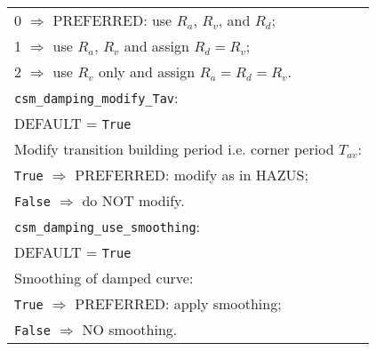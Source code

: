 \documentclass[a4paper, 12pt]{report}
\begin{document}
\begin{tabular}{|p{\textwidth}|}
 \hspace{0.5em} 0 $\Rightarrow$ \small{PREFERRED}: use $R_a$, $R_v$, and $R_d$; \\
 \hspace{0.5em} 1 $\Rightarrow$ use $R_a$, $R_v$ and assign $R_d= R_v$; \\
 \hspace{0.5em} 2 $\Rightarrow$ use $R_v$ only and assign $R_a=R_d=R_v$. \\
\hline \vspace{0.1em} \texttt{csm\_damping\_modify\_Tav}: \\
DEFAULT = \texttt{True} \\
Modify transition building period i.e. corner period $T_{av}$: \\
 \hspace{0.5em} \texttt{True} $\Rightarrow$ \small{PREFERRED}: modify as in HAZUS; \\
 \hspace{0.5em}  \texttt{False} $\Rightarrow$ do NOT modify. \\
\hline \vspace{0.1em} \texttt{csm\_damping\_use\_smoothing}: \\
DEFAULT = \texttt{True} \\
Smoothing of damped curve: \\
 \hspace{0.5em} \texttt{True} $\Rightarrow$ \small{PREFERRED}: apply smoothing; \\
 \hspace{0.5em} \texttt{False} $\Rightarrow$ NO smoothing.\\
\hline
\end{tabular}
\end{document}
